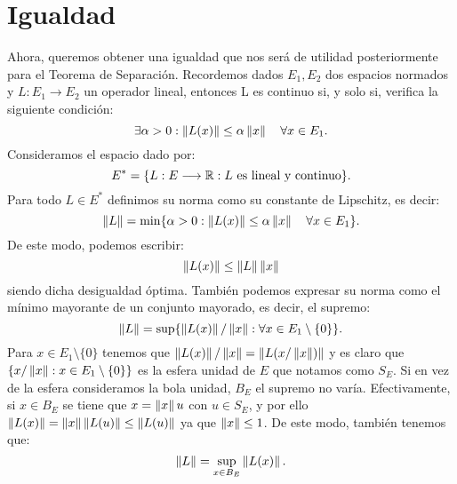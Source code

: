 \chapter{Igualdad}
\newcommand{\normSpace}{E}
	
Ahora, queremos obtener una igualdad que nos será de utilidad posteriormente para el Teorema de Separación. Recordemos dados $ \normSpace_1, \normSpace_2 $ dos espacios normados y $ L:\normSpace_1 \longrightarrow \normSpace_2 $ un operador lineal, entonces L es continuo si, y solo si, verifica la siguiente condición:
\[
\exists \alpha > 0 : \norm{L(x)} \leq \alpha \norm{x} \quad \forall x \in \normSpace_1.
\]
Consideramos el espacio dado por:
\[
\normSpace^* =  \lbrace L:\normSpace \longrightarrow \RR: L \text{ es lineal y continuo} \rbrace.
\]
Para todo $ L \in \normSpace^* $ definimos su norma como su constante de Lipschitz, es decir:
\[
\norm{L} = \min \lbrace \alpha > 0:  \norm{L(x)} \leq \alpha \norm{x} \quad \forall x \in \normSpace_1\rbrace.
\]
De este modo, podemos escribir:
\begin{equation*}\label{desigNorma}
	\left\Vert L(x)\right\Vert \leq \left\Vert L\right\Vert \left\Vert x\right\Vert
\end{equation*}
siendo dicha desigualdad óptima. También podemos expresar su norma como el mínimo mayorante de un conjunto mayorado, es decir, el supremo:
\[
\norm{L} = \sup \lbrace \norm{L(x)}/\norm{x} : \forall x \in \normSpace_1 \setminus \{0\}\rbrace.
\]
Para $  x \in \normSpace_1 \setminus \{0\} $ tenemos que $ \left\Vert L(x)\right\Vert/\left\Vert x\right\Vert = \left\Vert L(x/\left\Vert x\right\Vert)\right\Vert$ y es claro que $ \{ x/\norm{x} : x \in \normSpace_1 \setminus \{0\}\} $ es la esfera unidad de $ \normSpace $ que notamos como $ S_\normSpace $. Si en vez de la esfera consideramos la bola unidad, $ B_\normSpace $ el supremo no varía. Efectivamente, si $ x \in B_\normSpace  $ se tiene que $ x = \left\Vert x\right\Vert u $ con $ u \in  S_\normSpace$, y por ello $ \left\Vert L(x)\right\Vert = \left\Vert x\right\Vert\left\Vert L(u)\right\Vert \leq \left\Vert L(u)\right\Vert $ ya que $ \left\Vert x\right\Vert \leq 1 $. De este modo, también tenemos que:
\begin{equation*}\label{normSup}
	\norm{L} =\sup_{x \in B_\normSpace} \norm{L(x)}.
\end{equation*}

